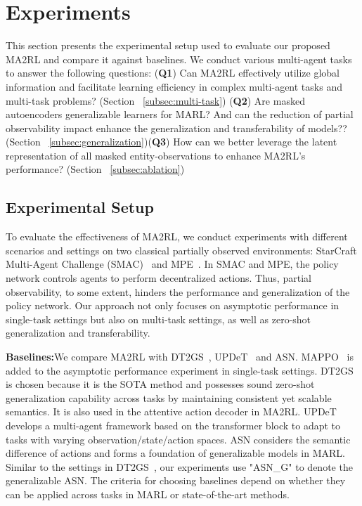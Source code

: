 \section{Experiments}
\label{sec:exp}
This section presents the experimental setup used to evaluate our proposed MA2RL and compare it against baselines. We conduct various multi-agent tasks to answer the following questions: (\textbf{Q1}) Can MA2RL effectively utilize global information and facilitate learning efficiency in complex multi-agent tasks and multi-task problems? (Section ~\ref{subsec:multi-task}) (\textbf{Q2}) Are masked autoencoders generalizable learners for MARL? And can the reduction of partial observability impact enhance the generalization and transferability of models?? (Section ~\ref{subsec:generalization})(\textbf{Q3}) How can we better leverage the latent representation of all masked entity-observations to enhance MA2RL's performance? (Section ~\ref{subsec:ablation})
\subsection{Experimental Setup}
\label{sec:exp_setup}
To evaluate the effectiveness of MA2RL, we conduct experiments with different scenarios and settings on two classical partially observed environments: StarCraft Multi-Agent Challenge (SMAC)~\cite{samvelyan2019starcraft} and MPE~\cite{lowe2017multi}. In SMAC and MPE, the policy network controls agents to perform decentralized actions. Thus, partial observability, to some extent, hinders the performance and generalization of the policy network. Our approach not only focuses on asymptotic performance in single-task settings but also on multi-task settings, as well as zero-shot generalization and transferability.

\textbf{Baselines:}We compare MA2RL with DT2GS~\cite{Decompose_Tian}, UPDeT~\cite{hu2021updet} and ASN\cite{wang2019action}. MAPPO~\cite{yu2022surprising} is added to the asymptotic performance experiment in single-task settings. DT2GS is chosen because it is the SOTA method and possesses sound zero-shot generalization capability across tasks by maintaining consistent yet scalable semantics. It is also used in the attentive action decoder in MA2RL. UPDeT develops a multi-agent framework based on the transformer block to adapt to tasks with varying observation/state/action spaces. ASN considers the semantic difference of actions and forms a foundation of generalizable models in MARL. Similar to the settings in DT2GS~\cite{Decompose_Tian}, our experiments use "ASN\_G" to denote the generalizable ASN. The criteria for choosing baselines depend on whether they can be applied across tasks in MARL or state-of-the-art methods.

